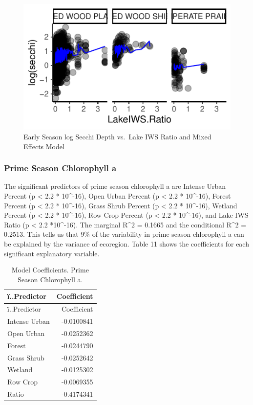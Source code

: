 \documentclass[12pt,]{article}
\begin{document}
\begin{figure}
\centering
\includegraphics{Bollt_Greif_Raby_Roth_Project_Final_files/figure-latex/unnamed-chunk-22-1.pdf}
\caption{Early Season log Secchi Depth vs.~Lake IWS Ratio and Mixed
Effects Model}
\end{figure}

\hypertarget{prime-season-chlorophyll-a}{%
\subsubsection{Prime Season Chlorophyll
a}\label{prime-season-chlorophyll-a}}

The significant predictors of prime season chlorophyll a are Intense
Urban Percent (p \textless{} 2.2 * 10\^{}-16), Open Urban Percent (p
\textless{} 2.2 * 10\^{}-16), Forest Percent (p \textless{} 2.2 *
10\^{}-16), Grass Shrub Percent (p \textless{} 2.2 * 10\^{}-16), Wetland
Percent (p \textless{} 2.2 * 10\^{}-16), Row Crop Percent (p \textless{}
2.2 * 10\^{}-16), and Lake IWS Ratio (p \textless{} 2.2 *10\^{}-16). The
marginal R\^{}2 = 0.1665 and the conditional R\^{}2 = 0.2513. This tells
us that 9\% of the variability in prime season chlorophyll a can be
explained by the variance of ecoregion. Table 11 shows the coefficients
for each significant explanatory variable.

\begin{longtable}[]{@{}lr@{}}
\caption{Model Coefficients. Prime Season Chlorophyll a.}\tabularnewline
\toprule
ï..Predictor & Coefficient\tabularnewline
\midrule
\endfirsthead
\toprule
ï..Predictor & Coefficient\tabularnewline
\midrule
\endhead
Intense Urban & -0.0100841\tabularnewline
Open Urban & -0.0252362\tabularnewline
Forest & -0.0244790\tabularnewline
Grass Shrub & -0.0252642\tabularnewline
Wetland & -0.0125302\tabularnewline
Row Crop & -0.0069355\tabularnewline
Ratio & -0.4174341\tabularnewline
\bottomrule
\end{longtable}
\end{document}

